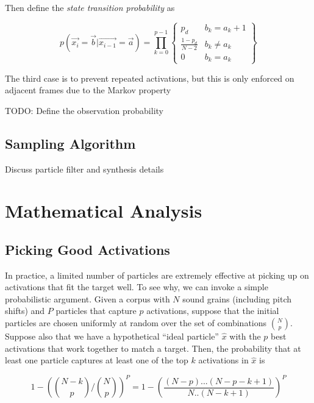 \documentclass[letterpaper, 12pt]{article}
\begin{document}
        Then define the {\em state transition probability} as 

		\begin{equation}
        	p(\vec{x_i} = \vec{b} | \vec{x_{i-1}} = \vec{a}) = \prod_{k=0}^{p-1} \left\{  \begin{array}{cc}  p_d & b_k = a_k+1  \\ \frac{1-p_d}{N-2} & b_k \neq a_k \\ 0 & b_k = a_k \end{array} \right\}
		\end{equation}

    
        The third case is to prevent repeated activations, but this is only enforced on adjacent frames due to the Markov property

		TODO: Define the observation probability


\subsection{Sampling Algorithm}

Discuss particle filter and synthesis details


\section{Mathematical Analysis}

\subsection{Picking Good Activations}

In practice, a limited number of particles are extremely effective at picking up on activations that fit the target well.  To see why, we can invoke a simple probabilistic argument.  Given a corpus with $N$ sound grains (including pitch shifts) and $P$ particles that capture $p$ activations, suppose that the initial particles are chosen uniformly at random over the set of combinations $\binom{N}{p}$.  Suppose also that we have a hypothetical ``ideal particle'' $\hat{x}$ with the $p$ best activations that work together to match a target.  Then, the probability that at least one particle captures at least one of the top $k$ activations in $\hat{x}$ is  

\begin{equation}
    \label{eq:initialsampleprob}
    1 - \left(\binom{N-k}{p} / \binom{N}{p}\right)^P = 1 - \left( \frac{(N-p)...(N-p-k+1)}{N..(N-k+1)}\right) ^P
\end{equation}
\end{document}

